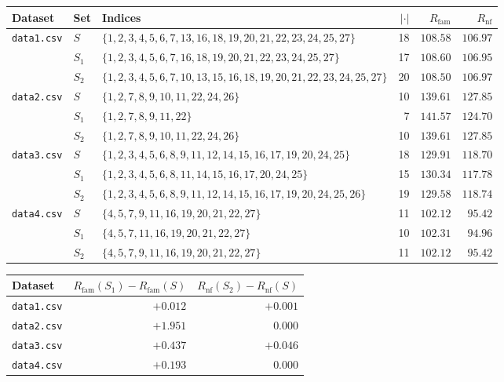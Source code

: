 \documentclass[11pt]{article}
\begin{document}
\begin{center}
\begin{tabular}{lllrrr}
\toprule
Dataset & Set & Indices & $|\cdot|$ & $R_{\text{fam}}$ & $R_{\text{nf}}$ \\
\midrule
\multirow{3}{*}{\texttt{data1.csv}}
 & $S$   & $\{1,2,3,4,5,6,7,13,16,18,19,20,21,22,23,24,25,27\}$       & 18 & $108.58$ & $106.97$ \\
 & $S_1$ & $\{1,2,3,4,5,6,7,16,18,19,20,21,22,23,24,25,27\}$          & 17 & $108.60$ & $106.95$ \\
 & $S_2$ & $\{1,2,3,4,5,6,7,10,13,15,16,18,19,20,21,22,23,24,25,27\}$ & 20 & $108.50$ & $106.97$ \\
\midrule
\multirow{3}{*}{\texttt{data2.csv}}
 & $S$   & $\{1,2,7,8,9,10,11,22,24,26\}$ & 10 & $139.61$ & $127.85$ \\
 & $S_1$ & $\{1,2,7,8,9,11,22\}$           &  7 & $141.57$ & $124.70$ \\
 & $S_2$ & $\{1,2,7,8,9,10,11,22,24,26\}$ & 10 & $139.61$ & $127.85$ \\
\midrule
\multirow{3}{*}{\texttt{data3.csv}}
 & $S$   & $\{1,2,3,4,5,6,8,9,11,12,14,15,16,17,19,20,24,25\}$    & 18 & $129.91$ & $118.70$ \\
 & $S_1$ & $\{1,2,3,4,5,6,8,11,14,15,16,17,20,24,25\}$            & 15 & $130.34$ & $117.78$ \\
 & $S_2$ & $\{1,2,3,4,5,6,8,9,11,12,14,15,16,17,19,20,24,25,26\}$ & 19 & $129.58$ & $118.74$ \\
\midrule
\multirow{3}{*}{\texttt{data4.csv}}
 & $S$   & $\{4,5,7,9,11,16,19,20,21,22,27\}$ & 11 & $102.12$ & $95.42$ \\
 & $S_1$ & $\{4,5,7,11,16,19,20,21,22,27\}$   & 10 & $102.31$ & $94.96$ \\
 & $S_2$ & $\{4,5,7,9,11,16,19,20,21,22,27\}$ & 11 & $102.12$ & $95.42$ \\
\bottomrule
\end{tabular}
\end{center}

\begin{center}
\begin{tabular}{lrr}
\toprule
Dataset & $R_{\text{fam}}(S_1) - R_{\text{fam}}(S)$ & $R_{\text{nf}}(S_2) - R_{\text{nf}}(S)$ \\
\midrule
\texttt{data1.csv} & $+0.012$ & $+0.001$ \\
\texttt{data2.csv} & $+1.951$ & $\phantom{+}0.000$ \\
\texttt{data3.csv} & $+0.437$ & $+0.046$ \\
\texttt{data4.csv} & $+0.193$ & $\phantom{+}0.000$ \\
\bottomrule
\end{tabular}
\end{center}
\end{document}

